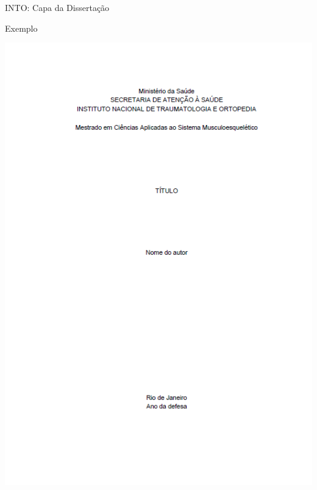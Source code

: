 \documentclass{beamer}
\begin{document}

\begin{frame}{\scriptsize INTO: Capa da Dissertação}
  \begin{exampleblock}{Exemplo}
    \begin{center}
      \includegraphics[height=.8\textheight]{EstruturaII/dirce}
    \end{center}
  \end{exampleblock}
\end{frame}
\end{document}
